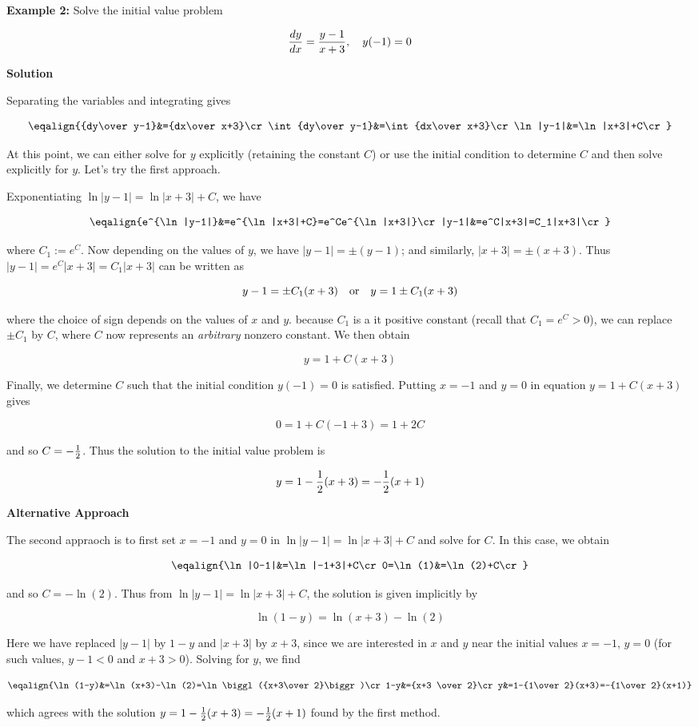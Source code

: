 \nopagenumbers
{\bf Example 2:} Solve the initial value problem

$${dy\over dx}={y-1\over x+3},\quad y(-1)=0$$

\vskip 10pt
{\bf Solution}

\vskip 6pt
Separating the variables and integrating gives

$$\eqalign{{dy\over y-1}&={dx\over x+3}\cr
	\int {dy\over y-1}&=\int {dx\over x+3}\cr
	\ln|y-1|&=\ln|x+3|+C\cr}$$

At this point, we can either solve for $y$ explicitly (retaining the constant $C$) or use the initial condition to determine $C$ and then solve explicitly for $y$. Let's try the first approach.

\vskip 1mm
Exponentiating $\ln|y-1|=\ln|x+3|+C$, we have

$$\eqalign{e^{\ln|y-1|}&=e^{\ln|x+3|+C}=e^Ce^{\ln|x+3|}\cr
	|y-1|&=e^C|x+3|=C_1|x+3|\cr}$$

where $C_1:=e^C$. Now depending on the values of $y$, we have $|y-1|=\pm(y-1)$; and similarly, $|x+3|=\pm(x+3)$. Thus $|y-1|=e^C|x+3|=C_1|x+3|$ can be written as

$$y-1=\pm C_1(x+3)\quad\hbox{or}\quad y=1\pm C_1(x+3)$$

where the choice of sign depends on the values of $x$ and $y$. because $C_1$ is a {it positive} constant (recall that $C_1=e^C>0$), we can replace $\pm C_1$ by $C$, where $C$ now represents an {\it arbitrary} nonzero constant. We then obtain

$$y=1+C(x+3)$$

Finally, we determine $C$ such that the initial condition $y(-1)=0$ is satisfied. Putting $x=-1$ and $y=0$ in equation $y=1+C(x+3)$ gives

$$0=1+C(-1+3)=1+2C$$

and so $C=-{1\over 2}$. Thus the solution to the initial value problem is

$$y=1-{1\over 2}(x+3)=-{1\over 2}(x+1)$$

\vskip 190bp
{\bf Alternative Approach}

\vskip 6pt
The second appraoch is to first set $x=-1$ and $y=0$ in $\ln|y-1|=\ln|x+3|+C$ and solve for $C$. In this case, we obtain

$$\eqalign{\ln|0-1|&=\ln|-1+3|+C\cr
		0=\ln(1)&=\ln(2)+C\cr}$$

and so $C=-\ln(2)$. Thus from $\ln|y-1|=\ln|x+3|+C$, the solution is given implicitly by

$$\ln(1-y)=\ln(x+3)-\ln(2)$$

Here we have replaced $|y-1|$ by $1-y$ and $|x+3|$ by $x+3$, since we are interested in $x$ and $y$ near the initial values $x=-1$, $y=0$ (for such values, $y-1<0$ and $x+3>0$). Solving for $y$, we find

$$\eqalign{\ln(1-y)&=\ln(x+3)-\ln(2)=\ln\biggl({x+3\over 2}\biggr)\cr
	1-y&={x+3 \over 2}\cr
	y&=1-{1\over 2}(x+3)=-{1\over 2}(x+1)}$$

which agrees with the solution $y=1-{1\over 2}(x+3)=-{1\over 2}(x+1)$ found by the first method.

\vfill\eject
\bye
